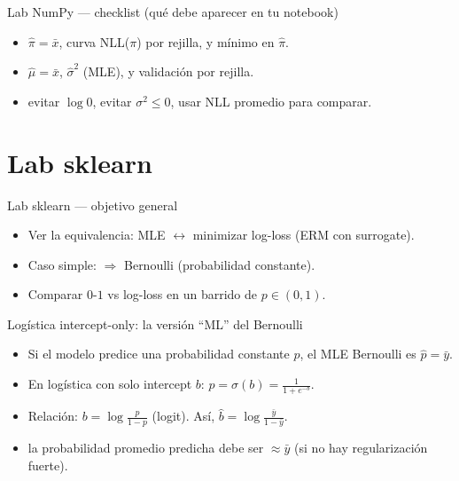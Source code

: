 \begin{frame}{Lab NumPy — checklist (qué debe aparecer en tu notebook)}
\small
\begin{itemize}
  \item {} \(\hat{\pi}=\bar{x}\), curva NLL(\(\pi\)) por rejilla, y mínimo en \(\hat{\pi}\). \hfill {}
  \item {} \(\hat{\mu}=\bar{x}\), \(\hat{\sigma}^2\) (MLE), y validación por rejilla. \hfill {}
  \item {} evitar \(\log 0\), evitar \(\sigma^2\le 0\), usar NLL promedio para comparar.
\end{itemize}
\end{frame}

\section[Lab sklearn]{Lab sklearn\label{sec:labsklearn}}

\begin{frame}{Lab sklearn — objetivo general}
\begin{itemize}
  \item Ver la equivalencia: MLE \(\leftrightarrow\) minimizar log-loss (ERM con surrogate). \hfill {}
  \item Caso simple:  \(\Rightarrow\) Bernoulli (probabilidad constante). \hfill {}
  \item Comparar \(0\text{-}1\) vs log-loss en un barrido de \(p\in(0,1)\). \hfill {}
\end{itemize}
\end{frame}

\begin{frame}{Logística intercept-only: la versión “ML” del Bernoulli}
\small
\begin{itemize}
  \item Si el modelo predice una probabilidad constante \(p\), el MLE Bernoulli es \(\hat{p}=\bar{y}\). \hfill {}
  \item En logística con solo intercept \(b\): \(p=\sigma(b)=\frac{1}{1+e^{-b}}\).
  \item Relación: \(b=\log\frac{p}{1-p}\) (logit). Así, \( \hat{b}=\log\frac{\bar{y}}{1-\bar{y}}\).
  \item {} la probabilidad promedio predicha debe ser \(\approx \bar{y}\) (si no hay regularización fuerte).
\end{itemize}
\end{frame}

